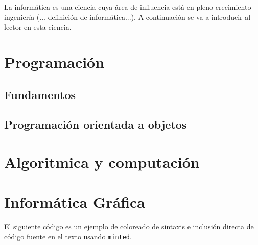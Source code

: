 \documentclass[oneside,openright,titlepage,numbers=noenddot,openany,headinclude,footinclude=true,
cleardoublepage=empty,abstractoff,BCOR=5mm,paper=a4,fontsize=12pt,main=spanish]{scrreprt}
\begin{document}
La informática es una ciencia cuya área de influencia está en pleno crecimiento ingeniería  (... {\Large definición de informática}...). A continuación se va a introducir al lector en esta ciencia.

\section{Programación}
\subsection{Fundamentos}

\subsection{Programación orientada a objetos}

\section{Algoritmica y computación}

\section{Informática Gráfica}



El siguiente código es un ejemplo de coloreado de sintaxis e inclusión
directa de código fuente en el texto usando \texttt{minted}.
\end{document}
